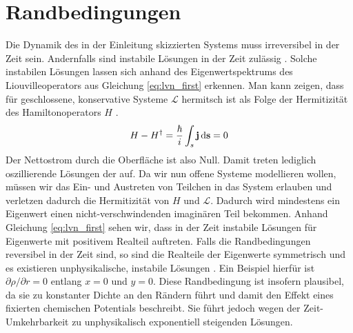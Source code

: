 \section{Randbedingungen}
Die Dynamik des in der Einleitung skizzierten Systems muss irreversibel in der Zeit sein. Andernfalls sind instabile Lösungen in der Zeit zulässig \cite{frensley2}. Solche instabilen Lösungen lassen sich anhand des Eigenwertspektrums des Liouvilleoperators aus Gleichung \eqref{eq:lvn_first} erkennen. Man kann zeigen, dass für geschlossene, konservative Systeme $\mathcal{L}$ hermitsch ist als Folge der Hermitizität des Hamiltonoperators $H$ \cite{frensley2}.
\begin{align}
  H- H^{\dagger} = \frac{\hbar}{i}\int_s \vb{j}\mathop{}\!\mathrm{d}\vb{s} = 0
\end{align}
Der Nettostrom durch die Oberfläche ist also Null. Damit treten lediglich oszillierende Lösungen der \lvn auf. Da wir nun offene Systeme modellieren wollen, müssen wir das Ein- und Austreten von Teilchen in das System erlauben und verletzen dadurch die Hermitizität von $H$ und $\mathcal{L}$. Dadurch wird mindestens ein Eigenwert einen nicht-verschwindenden imaginären Teil bekommen. Anhand Gleichung \eqref{eq:lvn_first} sehen wir, dass in der Zeit instabile Lösungen für Eigenwerte mit positivem Realteil auftreten. Falls die Randbedingungen reversibel in der Zeit sind, so sind die Realteile der Eigenwerte symmetrisch und es existieren unphysikalische, instabile Lösungen \cite{frensley2}. Ein Beispiel hierfür ist $\partial \rho /\partial r = 0$ entlang $x=0$ und $y=0$. Diese Randbedingung ist insofern plausibel, da sie zu konstanter Dichte an den Rändern führt und damit den Effekt eines fixierten chemischen Potentials beschreibt. Sie führt jedoch wegen der Zeit-Umkehrbarkeit zu unphysikalisch exponentiell steigenden Lösungen.

